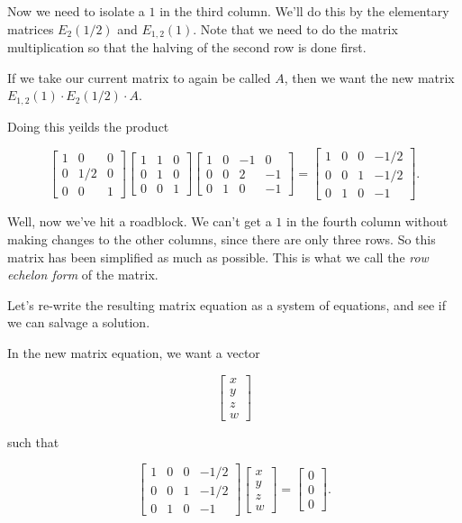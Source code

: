 \documentclass{ximera}
\begin{document}
\begin{solution}
Now we need to isolate a $1$ in the third column. We'll do this by the elementary matrices $E_{2}(1/2)$ and $E_{1,2}(1)$. Note that we need to do the matrix multiplication so that the halving of the second row is done first.

If we take our current matrix to again be called $A$, then we want the new matrix $E_{1,2}(1)\cdot E_{2}(1/2)\cdot A$.

Doing this yeilds the product

\begin{equation*}
  \begin{bmatrix}
    1 & 0 & 0 \\
    0 & 1/2 & 0 \\
    0 & 0 & 1
  \end{bmatrix} \begin{bmatrix}
    1 & 1 & 0 \\
    0 & 1 & 0 \\
    0 & 0 & 1
  \end{bmatrix} \begin{bmatrix}
    1 & 0 & -1 & 0 \\
    0 & 0 & 2 & -1 \\
    0 & 1 & 0 & -1
  \end{bmatrix} = \begin{bmatrix}
    1 & 0 & 0 & -1/2 \\
    0 & 0 & 1 & -1/2 \\
    0 & 1 & 0 & -1
  \end{bmatrix}.
\end{equation*}

Well, now we've hit a roadblock. We can't get a $1$ in the fourth column without making changes to the other columns, since there are only three rows. So this matrix has been simplified as much as possible. This is what we call the \emph{row echelon form} of the matrix.

Let's re-write the resulting matrix equation as a system of equations, and see if we can salvage a solution.

In the new matrix equation, we want a vector 

$$\begin{bmatrix} x \\ y \\ z \\ w \end{bmatrix}$$

such that

$$\begin{bmatrix}
    1 & 0 & 0 & -1/2 \\
    0 & 0 & 1 & -1/2 \\
    0 & 1 & 0 & -1
  \end{bmatrix} \begin{bmatrix} x \\ y \\ z \\ w \end{bmatrix} = \begin{bmatrix} 0 \\ 0 \\ 0 \end{bmatrix}.$$



\end{solution}
\end{document}

